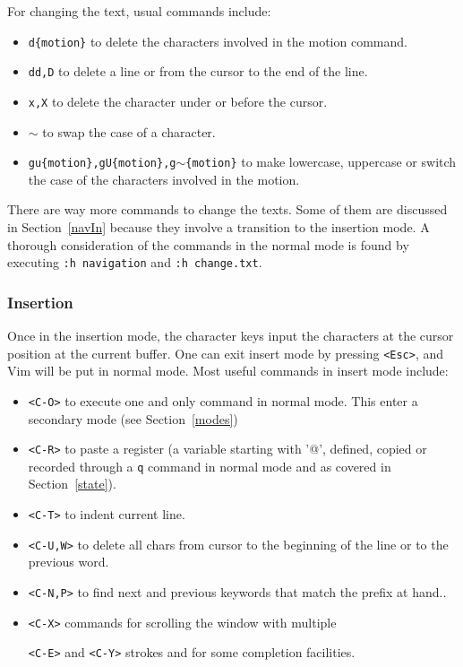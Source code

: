 \documentclass{article}
\newcommand{\ttt}[1] {
	\texttt{<#1>}}
\newcommand{\tttt}[1]{\texttt{#1}}
\begin{document}
For changing the text, usual commands include:
\begin{itemize}
  \item \texttt{d\{motion\}} to delete the characters
    involved in the motion command.
  \item \texttt{dd,D} to delete a line or from the cursor to the end of the line.
  \item \texttt{x,X} to delete the character under or before the cursor.
  \item \texttt{$\sim$} to swap the case of a character.
  \item \texttt{gu\{motion\},gU\{motion\},g$\sim$\{motion\}} to make lowercase, uppercase or switch the case of the characters involved in the motion.
\end{itemize}

There are way more commands to change the texts.
Some of them are discussed in Section~\ref{navIn}
because they involve a transition to the insertion mode.
A thorough consideration of the commands in the normal mode
is found by executing \texttt{:h navigation} and 
\texttt{:h change.txt}.

\subsubsection{Insertion}
Once in the insertion mode, the character keys
input the characters at the cursor position at the current buffer.
One can exit insert mode by pressing \texttt{<Esc>},
and Vim will be put in normal mode.
Most useful commands in insert mode include:
\begin{itemize}
  \item \ttt{C-O} to execute one and only command in normal mode.
	  This enter a secondary mode (see Section~\ref{modes})
  \item \ttt{C-R} to paste a register (a variable starting with
    '@', defined, copied or recorded through a \tttt{q} command in
    normal mode and as covered in Section~\ref{state}).
  \item \ttt{C-T} to indent current line.
  \item \ttt{C-U,W} to delete all chars from cursor to the beginning of
    the line or to the previous word.
  \item \ttt{C-N,P} to find next and previous keywords that match the prefix at hand..
  \item \ttt{C-X} commands for scrolling the window with multiple
    \ttt{C-E} and \ttt{C-Y} strokes and for some completion facilities.
\end{itemize}
\end{document}
